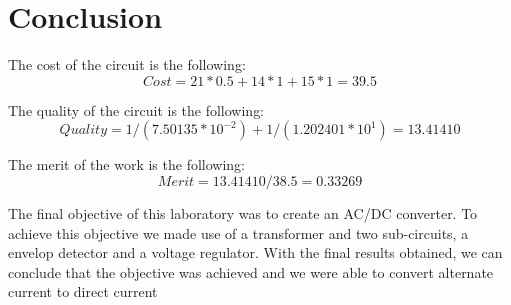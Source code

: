 \section{Conclusion}
\label{sec:conclusion}

The cost of the circuit is the following:
\begin{equation}
Cost = 21*0.5 + 14*1 + 15*1 = 39.5
\end{equation}

The quality of the circuit is the following:
\begin{equation}
Quality = 1/(7.50135*10^{-2}) + 1/(1.202401*10^{1}) = 13.41410
\end{equation}

The merit of the work is the following:
\begin{equation}
Merit = 13.41410/38.5 = 0.33269
\end{equation}

The final objective of this laboratory was to create an AC/DC converter.
To achieve this objective we made use of a transformer and two sub-circuits, a envelop detector and a voltage regulator.
With the final results obtained, we can conclude that the objective was achieved and we were able to convert alternate current to direct current
